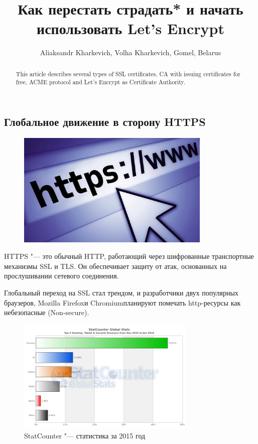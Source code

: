 \documentclass[10pt, a5paper]{article}
\begin{document}
\title{Как перестать страдать* и начать использовать Let's Encrypt}
\author{Aliaksandr Kharkevich, Volha Kharkevich, Gomel, Belarus}
\maketitle

\begin{abstract}
This article describes several types of SSL certificates, CA with issuing certificates for free, ACME protocol and Let's Encrypt as Certificate Authority.
\end{abstract}

\subsection*{Глобальное движение в сторону HTTPS}

\begin{figure}[h!]
  \centering
  \includegraphics[height=5.5cm]{w_03_2016_Kharkevich1.png}
  
\end{figure}

HTTPS "--- это обычный HTTP, работающий через шифрованные транспортные механизмы SSL и TLS. Он обеспечивает защиту от атак, основанных на прослушивании сетевого соединения.

Глобальный переход на SSL стал трендом, и разработчики двух популярных браузеров, Mozilla Firefox\footnotemark[1] и Chromium\footnotemark[2] планируют помечать http-ресурсы как небезопасные (Non-secure).

\begin{figure}[h!]
  \centering
  \includegraphics[height=5.5cm]{w_03_2016_Kharkevich2.png}
\caption*{StatCounter "--- статистика за 2015 год}
\end{figure}
\end{document}
